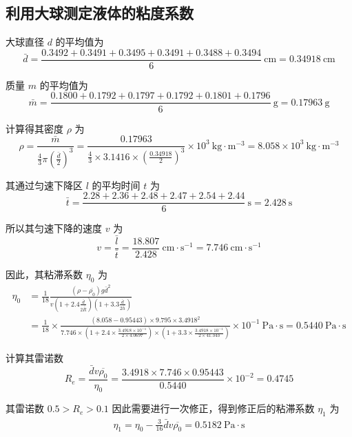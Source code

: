 \documentclass[10pt,a4paper]{article}	%
\begin{document}






	\subsection{利用大球测定液体的粘度系数}
	
	大球直径 $d$ 的平均值为
	$$
	\bar{d}=\frac{0.3492+0.3491+0.3495+0.3491+0.3488+0.3494}{6} \mathrm{~cm}=0.34918 \mathrm{~cm}
	$$

	质量 $m$ 的平均值为
	$$
	\bar{m}=\frac{0.1800+0.1792+0.1797+0.1792+0.1801+0.1796}{6} \mathrm{~g}=0.17963 \mathrm{~g}
	$$

	计算得其密度 $\rho$ 为
	$$
	\rho=\frac{\bar{m}}{\frac{4}{3} \pi\left(\frac{\bar{d}}{2}\right)^3}=\frac{0.17963}{\frac{4}{3} \times 3.1416 \times\left(\frac{0.34918}{2}\right)^3} \times 10^3 \mathrm{~kg} \cdot \mathrm{m}^{-3}=8.058 \times 10^3 \mathrm{~kg} \cdot \mathrm{m}^{-3}
	$$

	其通过匀速下降区 $l$ 的平均时间 $t$ 为
	$$
	\bar{t}=\frac{2.28+2.36+2.48+2.47+2.54+2.44}{6} \mathrm{~s}=2.428 \mathrm{~s}
	$$

	所以其匀速下降的速度 $v$ 为
	$$
	v=\frac{\bar{l}}{\bar{t}}=\frac{18.807}{2.428} \mathrm{~cm} \cdot \mathrm{s}^{-1}=7.746 \mathrm{~cm} \cdot \mathrm{s}^{-1}
	$$

	因此，其粘滞系数 $\eta_0$ 为
	$$
	\begin{aligned}
	\eta_0&=\frac{1}{18} \frac{\left(\rho-\overline{\rho_0}\right) g \bar{d}^2}{v\left(1+2.4 \frac{\bar{d}}{2 \overline{\bar{R}}}\right)\left(1+3.3 \frac{\bar{d}}{2 \bar{h}}\right)}\\
	&=\frac{1}{18} \times \frac{(8.058-0.95443) \times 9.795 \times 3.4918^2}{7.746 \times\left(1+2.4 \times \frac{3.4918 \times 10^{-1}}{2 \times 4.0697}\right) \times\left(1+3.3 \times \frac{3.4918 \times 10^{-1}}{2 \times 41.343}\right)} \times 10^{-1} \mathrm{~P a} \cdot \mathrm{s}=0.5440 \mathrm{~P a} \cdot \mathrm{s}	
	\end{aligned}
	$$

	计算其雷诺数
	$$
	R_{e}=\frac{\bar{d} v \overline{\rho_0}}{\eta_0}=\frac{3.4918 \times 7.746 \times 0.95443}{0.5440} \times 10^{-2}=0.4745
	$$

	其雷诺数 $0.5>R_{e} > 0.1$ 因此需要进行一次修正，得到修正后的粘滞系数 $\eta_1$ 为
	$$
	\begin{aligned}
	\eta_1 = \eta_0 - \frac{3}{16}\bar{d} v \overline{\rho_0} = 0.5182 \mathrm{~P a} \cdot \mathrm{s}	
	\end{aligned}
	$$
\end{document}
